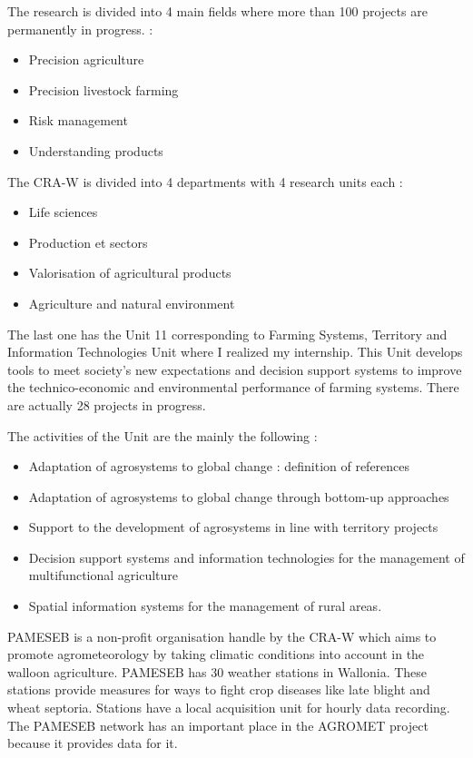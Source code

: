\documentclass[12pt,twoside]{reedthesis}
\providecommand{\tightlist}{%
  \setlength{\itemsep}{0pt}\setlength{\parskip}{0pt}}
\theoremstyle{definition}
\theoremstyle{definition}
\theoremstyle{definition}
\theoremstyle{remark}
\begin{document}
The research is divided into 4 main fields where more than 100 projects
are permanently in progress. :
\begin{itemize}
\tightlist
\item
  Precision agriculture
\item
  Precision livestock farming
\item
  Risk management
\item
  Understanding products
\end{itemize}
The CRA-W is divided into 4 departments with 4 research units each :
\begin{itemize}
\tightlist
\item
  Life sciences
\item
  Production et sectors
\item
  Valorisation of agricultural products
\item
  Agriculture and natural environment
\end{itemize}
The last one has the Unit 11 corresponding to Farming Systems, Territory
and Information Technologies Unit where I realized my internship. This
Unit develops tools to meet society's new expectations and decision
support systems to improve the technico-economic and environmental
performance of farming systems. There are actually 28 projects in
progress.

The activities of the Unit are the mainly the following :
\begin{itemize}
\tightlist
\item
  Adaptation of agrosystems to global change : definition of references
\item
  Adaptation of agrosystems to global change through bottom-up
  approaches
\item
  Support to the development of agrosystems in line with territory
  projects
\item
  Decision support systems and information technologies for the
  management of multifunctional agriculture
\item
  Spatial information systems for the management of rural areas.
\end{itemize}
PAMESEB is a non-profit organisation handle by the CRA-W which aims to
promote agrometeorology by taking climatic conditions into account in
the walloon agriculture. PAMESEB has 30 weather stations in Wallonia.
These stations provide measures for ways to fight crop diseases like
late blight and wheat septoria. Stations have a local acquisition unit
for hourly data recording. The PAMESEB network has an important place in
the AGROMET project because it provides data for it.
\end{document}
